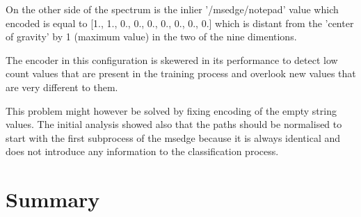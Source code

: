 \documentclass[a4paper,twoside,12pt]{book}
\newcounter{PagesWithoutNumbers}
\begin{document}
On the other side of the spectrum is the inlier '/msedge/notepad' value which encoded is equal to
[1., 1., 0., 0., 0., 0., 0., 0., 0.] which is distant from the 'center of gravity' by 1 (maximum 
value) in the two of the nine dimentions. 

The encoder in this configuration is skewered in its performance to detect low count values that
are present in the training process and overlook new values that are very different to them. 

This problem might however be solved by fixing encoding of the empty string values. The
initial analysis showed also that the paths should be normalised to start with the first 
subprocess of the msedge because it is always identical and does not introduce any information
to the classification process.


\chapter{Summary}




\backmatter
{}
\setcounter{page}{\value{PagesWithoutNumbers}}

\pagestyle{onlyPageNumbers}



\end{document}
